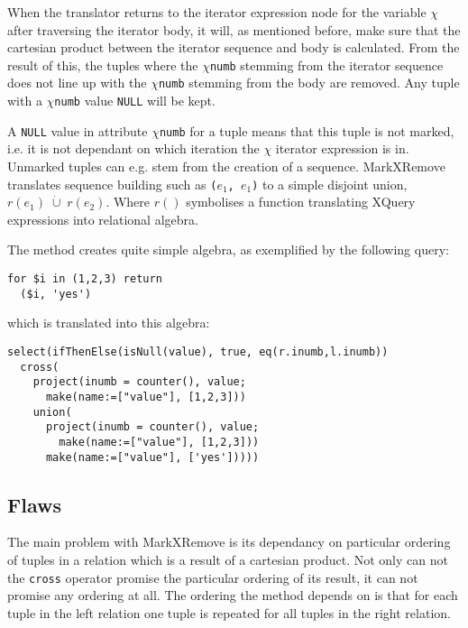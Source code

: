 When the translator returns to the iterator expression node for the variable $\chi$ after traversing the iterator
body, it will, as mentioned before, make sure that the cartesian product between the iterator sequence and body is
calculated. From the result of this, the tuples where the $\chi$\texttt{numb} stemming from the iterator
sequence does not line up with the $\chi$\texttt{numb} stemming from the body are removed. Any tuple with a
$\chi$\texttt{numb} value \texttt{NULL} will be kept.

A \texttt{NULL} value in attribute $\chi$\texttt{numb} for a tuple means that this tuple is not marked, i.e. it is
not dependant on which iteration the $\chi$ iterator expression is in. Unmarked tuples can e.g. stem
from the creation of a sequence. MarkXRemove translates sequence building such as \texttt{(}$e_{1}$\texttt{,
}$e_{1}$\texttt{)} to a simple disjoint union, $r(e_{1})\;\dot\cup\;r(e_{2})$. Where $r()$ symbolises a function
translating XQuery expressions into relational algebra.

The method creates quite simple algebra, as exemplified by the following query:
\begin{Verbatim}
for $i in (1,2,3) return 
  ($i, 'yes')
\end{Verbatim}
 which is translated into this algebra:
\begin{Verbatim}
select(ifThenElse(isNull(value), true, eq(r.inumb,l.inumb))
  cross(
    project(inumb = counter(), value;
      make(name:=["value"], [1,2,3]))
    union(
      project(inumb = counter(), value;
        make(name:=["value"], [1,2,3]))
      make(name:=["value"], ['yes']))))
\end{Verbatim} 

\subsection{Flaws}
\label{sect:translation:mxr:flaws}
The main problem with MarkXRemove is its dependancy on particular ordering of tuples in a relation which is a
result of a cartesian product. Not only can not the \texttt{cross} operator promise the particular ordering of its
result, it can not promise any ordering at all. The ordering the method depends on is that for each tuple in the
left relation one tuple is repeated for all tuples in the right relation.


